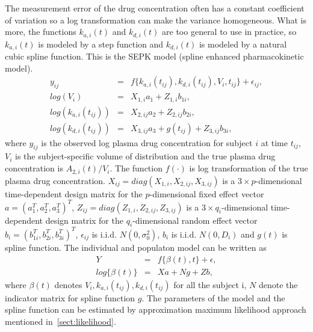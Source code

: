 \documentclass[12pt]{extarticle}
\begin{document}
The measurement error of the drug concentration often has a constant coefficient of variation so a log transformation can make the variance homogeneous. What is more, the functions  $k_{a,i}(t)$ and $k_{d,i}(t)$  are too general to use in practice, so $k_{a,i}(t)$ is modeled by a step function and $k_{d,i}(t)$ is modeled by a natural cubic spline function. This is the SEPK model (spline enhanced pharmacokinetic model). 
\begin{equation}
\begin{array}{rcl}
y_{ij} & = & f\{k_{a,i}(t_{ij}),k_{d,i}(t_{ij}),V_{i},t_{ij}\}+\epsilon_{ij}, \\
log(V_{i}) & = & X_{1,i}a_{1}+Z_{1,i}b_{1i}, \\
log(k_{a,i}(t_{ij})) & = & X_{2,ij}a_{2}+Z_{2,ij}b_{2i}, \\
log(k_{d,i}(t_{ij})) & = & X_{3,ij}a_{3}+g(t_{ij})+Z_{3,ij}b_{3i}, 
\end{array}
\end{equation}
where $y_{ij}$ is the observed log plasma drug concentration for subject $i$ at time $t_{ij}$, $V_{i}$ is the subject-specific volume of distribution and the true plasma drug concentration is $A_{2,i}(t)/V_{i}$. The function $f(\cdot)$ is log transformation of the true plasma drug concentration. $X_{ij}=diag(X_{1,i},X_{2,ij},X_{3,ij})$ is a $3\times{}p$-dimensional time-dependent design matrix for the $p$-dimensional fixed effect vector $a=(a_{1}^{T},a_{2}^{T},a_{3}^{T})^{T}$, $Z_{ij}=diag(Z_{1,i},Z_{2,ij},Z_{3,ij})$ is a  $3\times{}q_{i}$-dimensional time-dependent design matrix for the $q_{i}$-dimensional random effect vector $b_{i}=(b_{1i}^{T},b_{2i}^{T},b_{3i}^{T})^{T}$, $\epsilon_{ij}$ is i.i.d. $N(0,\sigma_{0}^{2})$, $b_{i}$ is i.i.d. $N(0,D_{i})$ and $g(t)$ is spline function. The individual and populaton model can be written as
\begin{equation}
\begin{array}{rcl}
Y & = & f\{\beta(t),t\}+\epsilon, \\
log\{\beta(t)\} & = & Xa+Ng+Zb,
\end{array}
\end{equation} 
where $\beta(t)$ denotes $V_{i},k_{a,i}(t_{ij}),k_{d,i}(t_{ij})$ for all the subject i, $N$ denote the indicator matrix for spline function $g$. The parameters of the model and the spline function can be estimated by approximation maximum likelihood approach mentioned in~\ref{sect:likelihood}. 
\end{document}
